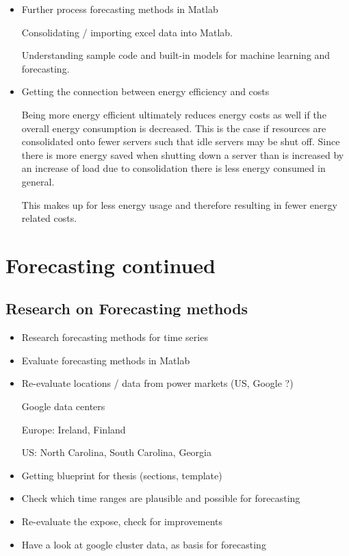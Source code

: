 \documentclass[a4paper]{article}
\begin{document}
\begin{itemize}
\item Further process forecasting methods in Matlab

Consolidating / importing excel data into Matlab. 

Understanding sample code and built-in models for machine learning and forecasting. 

\item Getting the connection between energy efficiency and costs

Being more energy efficient ultimately reduces energy costs as well if the overall 
energy consumption is decreased. This is the case if resources are consolidated onto
fewer servers such that idle servers may be shut off. Since there is more energy saved
when shutting down a server than is increased by an increase of load due to consolidation
there is less energy consumed in general. 

This makes up for less energy usage and therefore resulting in fewer energy related costs. 

\end{itemize}


\vspace{1em}

\hfill\date{Week 18, from 05.05. to 11.05.}

\section{Forecasting continued}

\subsection{Research on Forecasting methods}

\begin{itemize}

\item Research forecasting methods for time series

\item Evaluate forecasting methods in Matlab

\item Re-evaluate locations / data from power markets (US, Google ?)

Google data centers

Europe: Ireland, Finland

US: North Carolina, South Carolina, Georgia

\item Getting blueprint for thesis (sections, template)

\item Check which time ranges are plausible and possible for forecasting

\item Re-evaluate the expose, check for improvements

\item Have a look at google cluster data, as basis for forecasting

\end{itemize}
\end{document}
